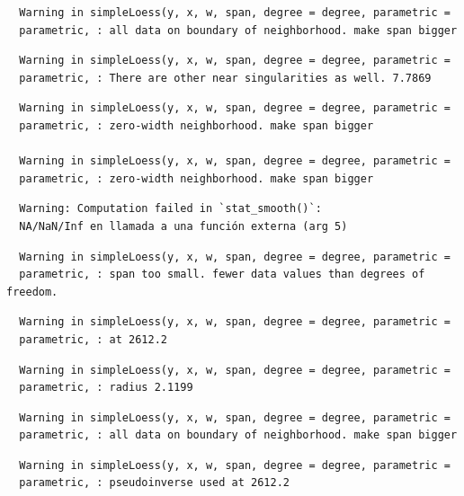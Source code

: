 \documentclass[12pt,twoside]{reedthesis}
\begin{document}
  \begin{verbatim}
  Warning in simpleLoess(y, x, w, span, degree = degree, parametric =
  parametric, : all data on boundary of neighborhood. make span bigger
  \end{verbatim}
  
  \begin{verbatim}
  Warning in simpleLoess(y, x, w, span, degree = degree, parametric =
  parametric, : There are other near singularities as well. 7.7869
  \end{verbatim}
  
  \begin{verbatim}
  Warning in simpleLoess(y, x, w, span, degree = degree, parametric =
  parametric, : zero-width neighborhood. make span bigger
  
  Warning in simpleLoess(y, x, w, span, degree = degree, parametric =
  parametric, : zero-width neighborhood. make span bigger
  \end{verbatim}
  
  \begin{verbatim}
  Warning: Computation failed in `stat_smooth()`:
  NA/NaN/Inf en llamada a una función externa (arg 5)
  \end{verbatim}
  
  \begin{verbatim}
  Warning in simpleLoess(y, x, w, span, degree = degree, parametric =
  parametric, : span too small. fewer data values than degrees of freedom.
  \end{verbatim}
  
  \begin{verbatim}
  Warning in simpleLoess(y, x, w, span, degree = degree, parametric =
  parametric, : at 2612.2
  \end{verbatim}
  
  \begin{verbatim}
  Warning in simpleLoess(y, x, w, span, degree = degree, parametric =
  parametric, : radius 2.1199
  \end{verbatim}
  
  \begin{verbatim}
  Warning in simpleLoess(y, x, w, span, degree = degree, parametric =
  parametric, : all data on boundary of neighborhood. make span bigger
  \end{verbatim}
  
  \begin{verbatim}
  Warning in simpleLoess(y, x, w, span, degree = degree, parametric =
  parametric, : pseudoinverse used at 2612.2
  \end{verbatim}
  
\end{document}
